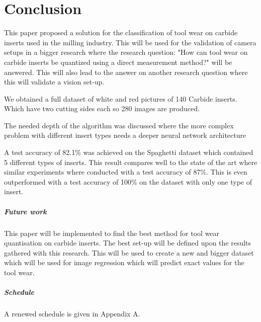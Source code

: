 \chapter{Conclusion}
\label{chap:conc}

This paper proposed a solution for the classification of tool wear on carbide inserts used in the milling industry. This will be used for the validation of camera setups in a bigger research where the research question: "How can tool wear on carbide inserts be quantized using a direct measurement method?" will be answered. This will also lead to the answer on another research question where this will validate a vision set-up.

We obtained a full dataset of white and red pictures of 140 Carbide inserts. Which have two cutting sides each so 280 images are produced.

The needed depth of the algorithm was discussed where the more complex problem with different insert types needs a deeper neural network architecture

A test accuracy of 82.1\% was achieved on the Spaghetti dataset which contained 5 different types of inserts. This result compares well to the state of the art where similar experiments where conducted with a test accuracy of 87\%. This is even outperformed with a test accuracy of 100\% on the dataset with only one type of insert.
 
\paragraph{Future work}
 This paper will be implemented to find the best method for tool wear quantisation on carbide inserts. The best set-up will be defined upon the results gathered with this research. This will be used to create a new and bigger dataset which will be used for image regression which will predict exact values for the tool wear.
 
 \paragraph{Schedule}
A renewed schedule is given in Appendix A. 
 